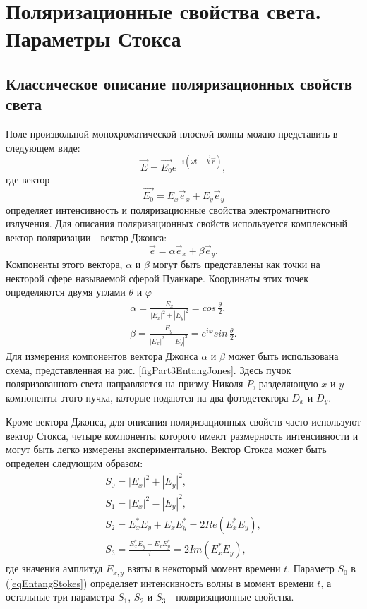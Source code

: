 \section{Поляризационные свойства света. Параметры Стокса}
\subsection{Классическое описание поляризационных свойств света}
Поле произвольной монохроматической плоской волны можно представить в
следующем виде:
\begin{equation}
\vec{E} = \vec{E_0} e^{-i \left(\omega t - \vec{k}\vec{r}\right)},
\nonumber
\end{equation}
где вектор 
\[
\vec{E_0} = E_{x}\vec{e}_x + E_{y}\vec{e}_y
\]
определяет интенсивность и поляризационные свойства электромагнитного
излучения. Для описания поляризационных свойств используется
комплексный вектор поляризации - вектор Джонса:
\begin{equation}
\vec{e} = \alpha \vec{e}_x + \beta \vec{e}_y.
\label{eqEntangJones}
\end{equation}
Компоненты этого вектора, $\alpha$ и $\beta$ могут быть представлены
как точки на некторой сфере называемой сферой Пуанкаре. Координаты
этих точек определяются двумя углами $\theta$ и $\varphi$
\begin{eqnarray}
\alpha = \frac{E_x}{\left|E_x\right|^2 + \left|E_y\right|^2} = 
 cos \, \frac{\theta}{2},
\nonumber \\
\beta = \frac{E_y}{\left|E_x\right|^2 + \left|E_y\right|^2} = 
 e^{i\varphi} sin \, \frac{\theta}{2}.
\nonumber
\end{eqnarray}
Для измерения компонентов вектора Джонса $\alpha$ и $\beta$ может быть
использована схема, представленная на
рис. \ref{figPart3EntangJones}. Здесь пучок поляризованного света
направляется на призму Николя $P$, разделяющую $x$ и $y$ компоненты
этого пучка, которые подаются на два фотодетектора $D_x$ и $D_y$.



Кроме вектора Джонса, для описания поляризационных свойств часто
используют вектор Стокса, четыре компоненты которого
имеют размерность интенсивности и могут быть легко измерены
экспериментально. Вектор Стокса может быть определен следующим образом:
\begin{eqnarray}
S_0 = \left|E_x\right|^2 + \left|E_y\right|^2,
\nonumber \\
S_1 = \left|E_x\right|^2 - \left|E_y\right|^2,
\nonumber \\
S_2 = E_x^{*} E_y + E_x E_y^{*} = 2 Re \left(E_x^{*} E_y\right),
\nonumber \\
S_3 = \frac{E_x^{*} E_y - E_x E_y^{*}}{i} = 2 Im \left(E_x^{*}
E_y\right),
\label{eqEntangStokes}
\end{eqnarray}
где значения амплитуд $E_{x,y}$ взяты в некоторый момент времени $t$. 
Параметр $S_0$ в (\ref{eqEntangStokes}) определяет интенсивность волны
в момент времени $t$,
а остальные три параметра $S_1$, $S_2$ и $S_3$ - поляризационные
свойства. 


